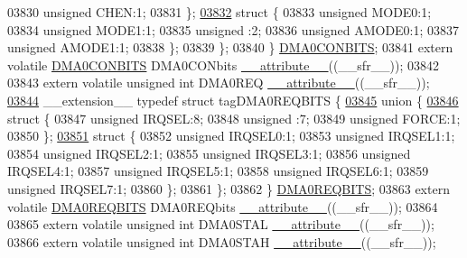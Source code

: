 \begin{DoxyCode}
03830       \textcolor{keywordtype}{unsigned} CHEN:1;
03831     \};
\hypertarget{a00009_source_l03832}{}\hyperlink{a00009}{03832}     \textcolor{keyword}{struct }\{
03833       \textcolor{keywordtype}{unsigned} MODE0:1;
03834       \textcolor{keywordtype}{unsigned} MODE1:1;
03835       \textcolor{keywordtype}{unsigned} :2;
03836       \textcolor{keywordtype}{unsigned} AMODE0:1;
03837       \textcolor{keywordtype}{unsigned} AMODE1:1;
03838     \};
03839   \};
03840 \} \hyperlink{a00008_db/d95/a00391}{DMA0CONBITS};
03841 \textcolor{keyword}{extern} \textcolor{keyword}{volatile} \hyperlink{a00008_db/d95/a00391}{DMA0CONBITS} DMA0CONbits \hyperlink{a00009_a493c46f03454991ccc5aa7a6e1dfb2a7}{\_\_attribute\_\_}((\_\_sfr\_\_));
03842 
03843 \textcolor{keyword}{extern} \textcolor{keyword}{volatile} \textcolor{keywordtype}{unsigned} \textcolor{keywordtype}{int}  DMA0REQ \hyperlink{a00009_a493c46f03454991ccc5aa7a6e1dfb2a7}{\_\_attribute\_\_}((\_\_sfr\_\_));
\hypertarget{a00009_source_l03844}{}\hyperlink{a00008}{03844} \_\_extension\_\_ \textcolor{keyword}{typedef} \textcolor{keyword}{struct }tagDMA0REQBITS \{
\hypertarget{a00009_source_l03845}{}\hyperlink{a00009}{03845}   \textcolor{keyword}{union }\{
\hypertarget{a00009_source_l03846}{}\hyperlink{a00009}{03846}     \textcolor{keyword}{struct }\{
03847       \textcolor{keywordtype}{unsigned} IRQSEL:8;
03848       \textcolor{keywordtype}{unsigned} :7;
03849       \textcolor{keywordtype}{unsigned} FORCE:1;
03850     \};
\hypertarget{a00009_source_l03851}{}\hyperlink{a00009}{03851}     \textcolor{keyword}{struct }\{
03852       \textcolor{keywordtype}{unsigned} IRQSEL0:1;
03853       \textcolor{keywordtype}{unsigned} IRQSEL1:1;
03854       \textcolor{keywordtype}{unsigned} IRQSEL2:1;
03855       \textcolor{keywordtype}{unsigned} IRQSEL3:1;
03856       \textcolor{keywordtype}{unsigned} IRQSEL4:1;
03857       \textcolor{keywordtype}{unsigned} IRQSEL5:1;
03858       \textcolor{keywordtype}{unsigned} IRQSEL6:1;
03859       \textcolor{keywordtype}{unsigned} IRQSEL7:1;
03860     \};
03861   \};
03862 \} \hyperlink{a00008_d9/dad/a00394}{DMA0REQBITS};
03863 \textcolor{keyword}{extern} \textcolor{keyword}{volatile} \hyperlink{a00008_d9/dad/a00394}{DMA0REQBITS} DMA0REQbits \hyperlink{a00009_a493c46f03454991ccc5aa7a6e1dfb2a7}{\_\_attribute\_\_}((\_\_sfr\_\_));
03864 
03865 \textcolor{keyword}{extern} \textcolor{keyword}{volatile} \textcolor{keywordtype}{unsigned} \textcolor{keywordtype}{int}  DMA0STAL \hyperlink{a00009_a493c46f03454991ccc5aa7a6e1dfb2a7}{\_\_attribute\_\_}((\_\_sfr\_\_));
03866 \textcolor{keyword}{extern} \textcolor{keyword}{volatile} \textcolor{keywordtype}{unsigned} \textcolor{keywordtype}{int}  DMA0STAH \hyperlink{a00009_a493c46f03454991ccc5aa7a6e1dfb2a7}{\_\_attribute\_\_}((\_\_sfr\_\_));

\end{DoxyCode}
